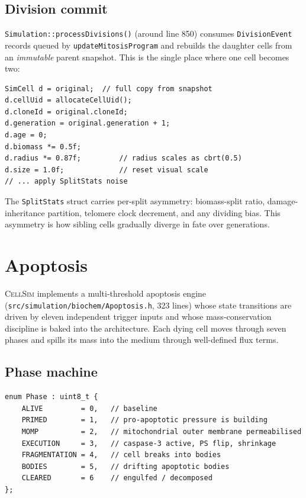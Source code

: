 \documentclass[11pt,letterpaper,twoside,openany]{book}
\newcommand{\code}[1]{\texttt{#1}}
\newcommand{\file}[1]{\texttt{\small#1}}
\begin{document}
\section{Division commit}

\code{Simulation::processDivisions()} (around line 850) consumes
\code{DivisionEvent} records queued by \code{updateMitosisProgram}
and rebuilds the daughter cells from an \emph{immutable} parent
snapshot. This is the single place where one cell becomes two:
\begin{lstlisting}
SimCell d = original;  // full copy from snapshot
d.cellUid = allocateCellUid();
d.cloneId = original.cloneId;
d.generation = original.generation + 1;
d.age = 0;
d.biomass *= 0.5f;
d.radius *= 0.87f;         // radius scales as cbrt(0.5)
d.size = 1.0f;             // reset visual scale
// ... apply SplitStats noise
\end{lstlisting}
The \code{SplitStats} struct carries per-split asymmetry:
biomass-split ratio, damage-inheritance partition, telomere clock
decrement, and any dividing bias. This asymmetry is how sibling
cells gradually diverge in fate over generations.

\chapter{Apoptosis}
\label{ch:apoptosis}

\textsc{CellSim} implements a multi-threshold apoptosis engine
(\file{src/simulation/biochem/Apoptosis.h}, 323 lines) whose state
transitions are driven by eleven independent trigger inputs and
whose mass-conservation discipline is baked into the architecture.
Each dying cell moves through seven phases and spills its mass into
the medium through well-defined flux terms.

\section{Phase machine}

\begin{lstlisting}
enum Phase : uint8_t {
    ALIVE         = 0,   // baseline
    PRIMED        = 1,   // pro-apoptotic pressure is building
    MOMP          = 2,   // mitochondrial outer membrane permeabilised
    EXECUTION     = 3,   // caspase-3 active, PS flip, shrinkage
    FRAGMENTATION = 4,   // cell breaks into bodies
    BODIES        = 5,   // drifting apoptotic bodies
    CLEARED       = 6    // engulfed / decomposed
};
\end{lstlisting}
\end{document}
